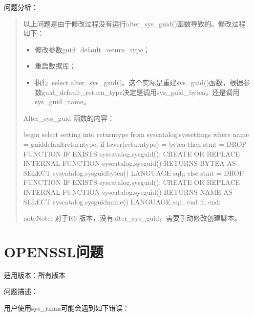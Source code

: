 \documentclass[letterpaper,10pt,english]{sphinxmanual}
\begin{document}
问题分析：
\begin{quote}

以上问题是由于修改过程没有运行alter\_sys\_guid()函数导致的。修改过程如下：
\begin{itemize}
\item {} 
修改参数guid\_default\_return\_type；

\item {} 
重启数据库；

\item {} 
执行 select alter\_sys\_guid()。这个实际是重建sys\_guid()函数，根据参数guid\_default\_return\_type决定是调用sys\_guid\_bytea，还是调用sys\_guid\_name。

\end{itemize}

Alter\_sys\_guid 函数的内容：

\begin{sphinxVerbatim}[commandchars=\\\{\}]
begin
  select setting into return\PYGZus{}type from sys\PYGZus{}catalog.sys\PYGZus{}settings where name = \PYGZsq{}guid\PYGZus{}default\PYGZus{}return\PYGZus{}type\PYGZsq{};
  if lower(return\PYGZus{}type) = \PYGZsq{}bytea\PYGZsq{} then
    stmt = \PYGZsq{}DROP FUNCTION IF EXISTS sys\PYGZus{}catalog.sys\PYGZus{}guid();
     CREATE OR REPLACE INTERNAL FUNCTION sys\PYGZus{}catalog.sys\PYGZus{}guid() RETURNS BYTEA AS
\PYGZdl{}\PYGZdl{}SELECT sys\PYGZus{}catalog.sys\PYGZus{}guid\PYGZus{}bytea()\PYGZdl{}\PYGZdl{} LANGUAGE sql;\PYGZsq{};
  else
    stmt = \PYGZsq{}DROP FUNCTION IF EXISTS sys\PYGZus{}catalog.sys\PYGZus{}guid();
     CREATE OR REPLACE INTERNAL FUNCTION sys\PYGZus{}catalog.sys\PYGZus{}guid() RETURNS NAME AS
\PYGZdl{}\PYGZdl{}SELECT sys\PYGZus{}catalog.sys\PYGZus{}guid\PYGZus{}name()\PYGZdl{}\PYGZdl{} LANGUAGE sql;\PYGZsq{};
  end if;
end;
\end{sphinxVerbatim}

\begin{sphinxadmonition}{note}{Note:}
对于R6 版本，没有alter\_sys\_guid，需要手动修改创建脚本。
\end{sphinxadmonition}
\end{quote}


\section{OPENSSL问题}
\label{\detokenize{sql:openssl}}
适用版本：所有版本

问题描述：

用户使用sys\_rman可能会遇到如下错误：
\end{document}
